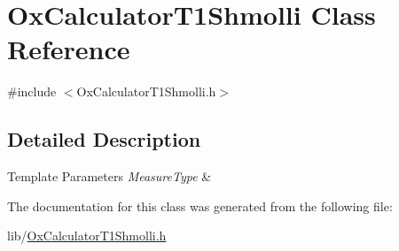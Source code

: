 \hypertarget{class_ox_calculator_t1_shmolli}{}\section{Ox\+Calculator\+T1\+Shmolli Class Reference}
\label{class_ox_calculator_t1_shmolli}


{\ttfamily \#include $<$Ox\+Calculator\+T1\+Shmolli.\+h$>$}



\subsection{Detailed Description}

\begin{DoxyTemplParams}{Template Parameters}
{\em Measure\+Type} & \\
\hline
\end{DoxyTemplParams}


The documentation for this class was generated from the following file\+:\begin{DoxyCompactItemize}
\item 
lib/\hyperlink{_ox_calculator_t1_shmolli_8h}{Ox\+Calculator\+T1\+Shmolli.\+h}\end{DoxyCompactItemize}
